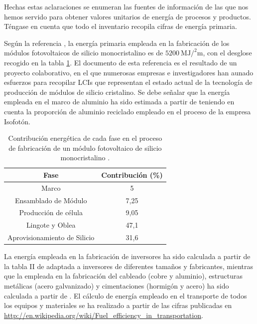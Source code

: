 Hechas estas aclaraciones se enumeran las fuentes de información de
las que nos hemos servido para obtener valores unitarios de energía
de procesos y productos. Téngase en cuenta que todo el inventario
recopila cifras de energía primaria. 

Según la referencia \cite{Alsema.Wild-Scholten2006}, la energía
primaria empleada en la fabricación de los módulos fotovoltaicos de
silicio monocristalino es de
$\SI{5200}{\mega\joule\per\squared\meter}$, con el desglose recogido
en la tabla \ref{tab:ContribucionEnergetica}. El documento de esta
referencia es el resultado de un proyecto colaborativo, en el que
numerosas empresas e investigadores han aunado esfuerzos para
recopilar LCIs que representan el estado actual de la tecnología de
producción de módulos de silicio cristalino. Se debe señalar que la
energía empleada en el marco de aluminio ha sido estimada a partir de
\cite{Baird.Alcorn.ea1997} teniendo en cuenta la proporción de
aluminio reciclado empleado en el proceso de la empresa Isofotón.

\begin{table}[p]
  \caption[Contribución energética de cada fase en el proceso de fabricación
  de un módulo fotovoltaico de silicio monocristalino.]{\label{tab:ContribucionEnergetica}Contribución energética
    de cada fase en el proceso de fabricación de un módulo fotovoltaico
    de silicio monocristalino \cite{Alsema.Wild-Scholten2006}.}

\centering{}%
\begin{tabular}{cc}
\toprule
Fase & Contribución (\%)\tabularnewline
\midrule
Marco & 5\tabularnewline
\midrule
Ensamblado de Módulo & 7,25\tabularnewline
\midrule
Producción de célula & 9,05\tabularnewline
\midrule
Lingote y Oblea & 47,1\tabularnewline
\midrule
Aprovisionamiento de Silicio & 31,6\tabularnewline
\bottomrule
\end{tabular}
\end{table}


La energía empleada en la fabricación de inversores ha sido calculada
a partir de la tabla II de \cite{Alsema.Wild-Scholten2006} adaptada a
inversores de diferentes tamaños y fabricantes, mientras que la
empleada en la fabricación del cableado (cobre y aluminio),
estructuras metálicas (acero galvanizado) y cimentaciones (hormigón y
acero) ha sido calculada a partir de \cite{Baird.Alcorn.ea1997}. El
cálculo de energía empleado en el transporte de todos los equipos y
materiales se ha realizado a partir de las cifras publicadas en
\url{http://en.wikipedia.org/wiki/Fuel_efficiency_in_transportation}.

